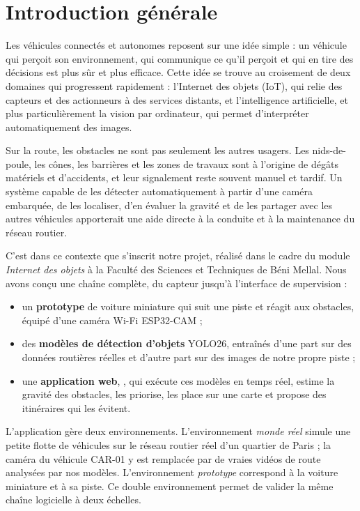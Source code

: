 \chapter*{Introduction générale}

Les véhicules connectés et autonomes reposent sur une idée simple : un véhicule qui perçoit son environnement,
qui communique ce qu'il perçoit et qui en tire des décisions est plus sûr et plus efficace. Cette idée se trouve
au croisement de deux domaines qui progressent rapidement : l'Internet des objets (IoT), qui relie des capteurs et
des actionneurs à des services distants, et l'intelligence artificielle, et plus particulièrement la vision par
ordinateur, qui permet d'interpréter automatiquement des images.

Sur la route, les obstacles ne sont pas seulement les autres usagers. Les nids-de-poule, les cônes, les barrières
et les zones de travaux sont à l'origine de dégâts matériels et d'accidents, et leur signalement reste souvent
manuel et tardif. Un système capable de les détecter automatiquement à partir d'une caméra embarquée, de les
localiser, d'en évaluer la gravité et de les partager avec les autres véhicules apporterait une aide directe à la
conduite et à la maintenance du réseau routier.

C'est dans ce contexte que s'inscrit notre projet, réalisé dans le cadre du module \emph{Internet des objets} à la
Faculté des Sciences et Techniques de Béni Mellal. Nous avons conçu une chaîne complète, du capteur jusqu'à
l'interface de supervision :
\begin{itemize}
  \item un \textbf{prototype} de voiture miniature qui suit une piste et réagit aux obstacles, équipé d'une
        caméra Wi-Fi ESP32-CAM ;
  \item des \textbf{modèles de détection d'objets} YOLO26, entraînés d'une part sur des données routières réelles
        et d'autre part sur des images de notre propre piste ;
  \item une \textbf{application web}, \app, qui exécute ces modèles en temps réel, estime la gravité des
        obstacles, les priorise, les place sur une carte et propose des itinéraires qui les évitent.
\end{itemize}

L'application gère deux environnements. L'environnement \emph{monde réel} simule une petite flotte de véhicules
sur le réseau routier réel d'un quartier de Paris ; la caméra du véhicule CAR-01 y est remplacée par de vraies
vidéos de route analysées par nos modèles. L'environnement \emph{prototype} correspond à la voiture miniature et
à sa piste. Ce double environnement permet de valider la même chaîne logicielle à deux échelles.

